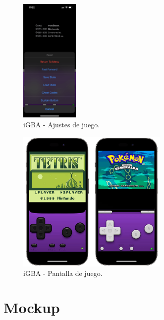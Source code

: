 \begin{figure}[h]
    \centering
    \includegraphics[width=0.25\textwidth]{include/images/igbasettings.PNG}
    \caption{iGBA - Ajustes de juego.}
    \label{figure:igbasettings}
\end{figure}

\begin{figure}[h]
    \centering
    \includegraphics[width=0.65\textwidth]{include/images/iGBAgame.png}
    \caption{iGBA - Pantalla de juego.}
    \label{figure:igbagame}
\end{figure}

\clearpage

\section{Mockup}

